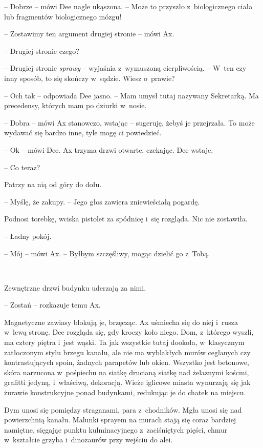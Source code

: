 \documentclass[oneside,polish,11pt,sfheadings]{mwbk}
\begin{document}
-- Dobrze -- mówi Dee nagle ukąszona. -- Może to przyszło z~biologicznego
ciała lub fragmentów biologicznego mózgu!

-- Zostawimy ten argument drugiej stronie -- mówi Ax.

-- Drugiej stronie czego?

-- Drugiej stronie \emph{sprawy} -- wyjaśnia z~wymuszoną cierpliwością. -- W~ten czy inny sposób, to się skończy w~sądzie. Wiesz o~prawie?

-- Och tak -- odpowiada Dee jasno. -- Mam umysł tutaj nazywany Sekretarką.
Ma precedensy, których mam po dziurki w~nosie.

-- Dobra -- mówi Ax stanowczo, wstając -- sugeruję, żebyś je przejrzała. To
może wydawać się bardzo inne, tyle mogę ci powiedzieć.

-- Ok -- mówi Dee. Ax trzyma drzwi otwarte, czekając. Dee wstaje.

-- Co teraz?

Patrzy na nią od góry do dołu. 

-- Myślę, że zakupy. -- Jego głos zawiera
zniewieściałą pogardę.

Podnosi torebkę, wciska pistolet za spódnicę i~się rozgląda. Nic nie
zostawiła.

-- Ładny pokój.

-- Mój -- mówi Ax. -- Byłbym szczęśliwy, mogąc dzielić go z~Tobą.

~

Zewnętrzne drzwi budynku uderzają za nimi. 

-- Zostań -- rozkazuje temu Ax.

Magnetyczne zawiasy blokują je, brzęcząc. Ax uśmiecha się do niej i~rusza w~lewą stronę. Dee rozgląda się, gdy kroczy koło niego. Dom, z~którego wyszli, ma cztery piętra i~jest wąski. Ta jak wszystkie tutaj
dookoła, w~klasycznym zatłoczonym stylu brzegu kanału, ale nie ma
wyblakłych murów ceglanych czy kontrastujących spoin, żadnych parapetów
lub okien. Wszystko jest betonowe, skóra narzucona w~pośpiechu na siatkę
drucianą siatkę nad żelaznymi koścmi, grafitti jedyną, i~właściwą,
dekoracją. Wieże iglicowe miasta wynurzają się jak żurawie konstrukcyjne
ponad budynkami, redukując je do chatek na miejscu.

Dym unosi się pomiędzy straganami, para z~chodników. Mgła unosi się nad
powierzchnią kanału. Malunki sprayem na murach stają się coraz bardziej
namiętne, sięgając punktu kulminacyjnego z~zaciśniętych pięści, chmur w~kształcie grzyba i~dinozaurów przy wejściu do alei.
\end{document}
